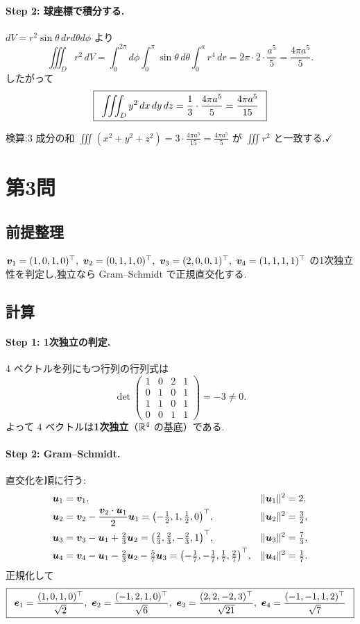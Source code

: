 \documentclass[11pt,a4paper]{article}
\begin{document}
\paragraph{Step 2: 球座標で積分する.}
$dV=r^2\sin\theta\,drd\theta d\phi$ より
\[
\iiint_D r^2\,dV
=\int_0^{2\pi}\!\!d\phi\int_0^{\pi}\!\!\sin\theta\,d\theta\int_0^{a}r^4\,dr
=2\pi\cdot2\cdot\frac{a^5}{5}=\frac{4\pi a^5}{5}.
\]
したがって
\[
\ans{\ \iiint_D y^2\,dx\,dy\,dz=\frac13\cdot\frac{4\pi a^5}{5}=\frac{4\pi a^5}{15}\ }
\]

検算:$3$ 成分の和 $\iiint(x^2+y^2+z^2)=3\cdot\frac{4\pi a^5}{15}=\frac{4\pi a^5}{5}$ が
$\iiint r^2$ と一致する.$\checkmark$

\section*{第3問}

\subsection*{前提整理}

$\vv_1=(1,0,1,0)^\top,\ \vv_2=(0,1,1,0)^\top,\ \vv_3=(2,0,0,1)^\top,\ \vv_4=(1,1,1,1)^\top$
の1次独立性を判定し,独立なら Gram--Schmidt で正規直交化する.

\subsection*{計算}

\paragraph{Step 1: 1次独立の判定.}
$4$ ベクトルを列にもつ行列の行列式は
\[
\det\begin{pmatrix}1&0&2&1\\0&1&0&1\\1&1&0&1\\0&0&1&1\end{pmatrix}=-3\neq0.
\]
よって $4$ ベクトルは\textbf{1次独立}（$\mathbb{R}^4$ の基底）である.

\paragraph{Step 2: Gram--Schmidt.}
直交化を順に行う:
\[
\begin{aligned}
\bm{u}_1&=\bm{v}_1,&\|\bm{u}_1\|^2&=2,\\
\bm{u}_2&=\bm{v}_2-\frac{\bm{v}_2\cdot\bm{u}_1}{2}\bm{u}_1=\bigl(-\tfrac12,1,\tfrac12,0\bigr)^\top,&\|\bm{u}_2\|^2&=\tfrac32,\\
\bm{u}_3&=\bm{v}_3-\bm{u}_1+\tfrac23\bm{u}_2=\bigl(\tfrac23,\tfrac23,-\tfrac23,1\bigr)^\top,&\|\bm{u}_3\|^2&=\tfrac73,\\
\bm{u}_4&=\bm{v}_4-\bm{u}_1-\tfrac23\bm{u}_2-\tfrac57\bm{u}_3=\bigl(-\tfrac17,-\tfrac17,\tfrac17,\tfrac27\bigr)^\top,&\|\bm{u}_4\|^2&=\tfrac17.
\end{aligned}
\]
正規化して
\[
\boxed{\,\
\bm{e}_1=\frac{(1,0,1,0)^\top}{\sqrt2},\
\bm{e}_2=\frac{(-1,2,1,0)^\top}{\sqrt6},\
\bm{e}_3=\frac{(2,2,-2,3)^\top}{\sqrt{21}},\
\bm{e}_4=\frac{(-1,-1,1,2)^\top}{\sqrt7}\ \,}
\]
\end{document}
